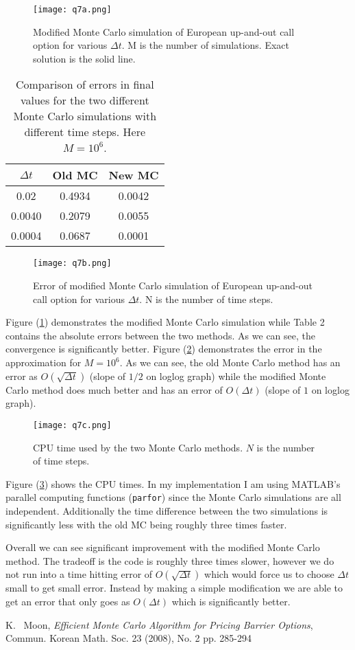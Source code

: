 \documentclass[10pt,english]{article}
\theoremstyle{plain}
\newcommand{\dt}{\Delta t}
\begin{document}
\begin{enumerate}
\begin{figure}
\begin{center}
\texttt{[image: q7a.png]}
\end{center}
\caption{Modified Monte Carlo simulation of European up-and-out call option for various $\dt$. M is the number of simulations. Exact solution is the solid line.}\label{q7a}
\end{figure}
\begin{table}
\centering
\begin{tabular}{|c|c|c|}
\hline
  $\dt$ & Old MC & New MC \\
\hline
  0.02 &  0.4934 & 0.0042\\
  0.0040 &  0.2079 & 0.0055\\
  0.0004  &  0.0687 & 0.0001\\
\hline
\end{tabular}
\caption{Comparison of errors in final values for the two different Monte Carlo simulations with different time steps. Here $M=10^{6}$.}
\end{table}
\begin{figure}
\begin{center}
\texttt{[image: q7b.png]}
\end{center}
\caption{Error of modified Monte Carlo simulation of European up-and-out call option for various $\dt$. N is the number of time steps.}\label{q7b}
\end{figure}

Figure (\ref{q7a}) demonstrates the modified Monte Carlo simulation while Table 2 contains the absolute errors between the two methods. As we can see, the convergence is significantly better. Figure (\ref{q7b}) demonstrates the error in the approximation for $M=10^{6}$. As we can see, the old Monte Carlo method has an error as $O(\sqrt{\dt})$ (slope of $1/2$ on loglog graph) while the modified Monte Carlo method does much better and has an error of $O(\dt)$ (slope of $1$ on loglog graph).
\begin{figure}
\begin{center}
\texttt{[image: q7c.png]}
\end{center}
\caption{CPU time used by the two Monte Carlo methods. $N$ is the number of time steps.}\label{q7c}
\end{figure}

Figure (\ref{q7c}) shows the CPU times. In my implementation I am using MATLAB's parallel computing functions (\texttt{parfor}) since the Monte Carlo simulations are all independent. Additionally the time difference between the two simulations is significantly less with the old MC being roughly three times faster. 

Overall we can see significant improvement with the modified Monte Carlo method. The tradeoff is the code is roughly three times slower, however we do not run into a time hitting error of $O(\sqrt{\dt})$ which would force us to choose $\dt$ small to get small error. Instead by making a simple modification we are able to get an error that only goes as $O(\dt)$ which is significantly better.
\end{enumerate}
\begin{thebibliography}{1}
 K. ~Moon, \textit{Efficient Monte Carlo Algorithm for Pricing Barrier Options}, Commun. Korean Math. Soc. 23 (2008), No. 2 pp. 285-294
\end{thebibliography}
\end{document}
